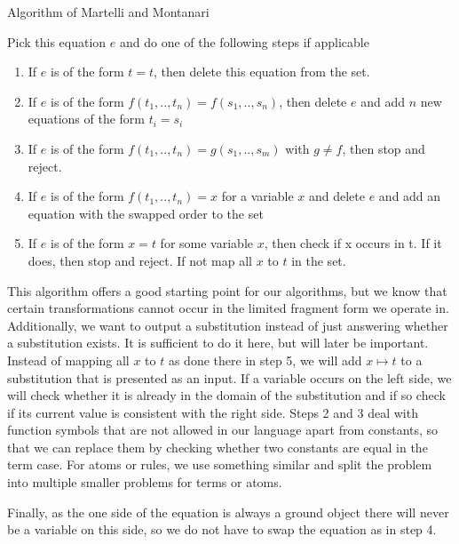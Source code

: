 \begin{algorithm}
    \caption{Algorithm of Martelli and Montanari}
\begin{algorithmic}
    \State Pick this equation $e$ and do one of the following steps if applicable
    \begin{enumerate}
        \item If $e$ is of the form $t = t$, then delete this equation from the set.
        \item If $e$ is of the form $f(t_1, .., t_n) = f(s_1,.., s_n)$, then delete $e$ and add $n$ new equations of the form $t_i = s_i$
        \item If $e$ is of the form $f(t_1, .., t_n) = g(s_1,.., s_m)$ with $g \neq f$, then stop and reject.
        \item If $e$ is of the form $f(t_1,..,t_n) = x$ for a variable $x$ and delete $e$ and add an equation with the swapped order to the set
        \item If $e$ is of the form $x=t$ for some variable $x$, then check if x occurs in t. If it does, then stop and reject. If not map all $x$ to $t$ in the set.
    \end{enumerate}
    \EndWhile
\end{algorithmic}
\end{algorithm}

This algorithm offers a good starting point for our algorithms, but we know that certain transformations cannot occur in the limited fragment form we operate in. Additionally, we want to output a substitution instead of just answering whether a substitution exists. It is sufficient to do it here, but will later be important. Instead of mapping all $x$ to $t$ as done there in step 5, we will add $x\mapsto t$ to a substitution that is presented as an input. If a variable occurs on the left side, we will check whether it is already in the domain of the substitution and if so check if its current value is consistent with the right side.
Steps 2 and 3 deal with function symbols that are not allowed in our language apart from constants, so that we can replace them by checking whether two constants are equal in the term case. For atoms or rules, we use something similar and split the problem into multiple smaller problems for terms or atoms.

Finally, as the one side of the equation is always a ground object there will never be a variable on this side, so we do not have to swap the equation as in step 4.

